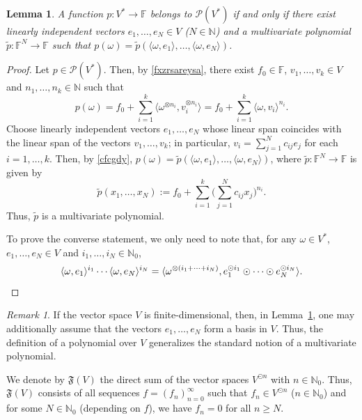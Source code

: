 \documentclass[12pt]{article}
\newtheorem{lemma}[theorem]{Lemma}
\theoremstyle{remark}
\theoremstyle{remark}
\theoremstyle{remark}
\newtheorem{remark}[theorem]{Remark}
\begin{document}
\begin{lemma}\label{cgtxststs5u}
A function $p:V^*\to\mathbb F$ belongs to $\mathcal P(V^*)$ if and only if there exist linearly independent vectors $e_1,\dots,e_N\in V$  ($N\in\mathbb N$) and a multivariate polynomial $\tilde p:\mathbb F^N\to\mathbb F$ such that $p(\omega)=\tilde p(\langle\omega,e_1\rangle,\dots,\langle\omega,e_N\rangle)$.
\end{lemma}

\begin{proof} Let $p\in\mathcal P(V^*)$. Then, by \eqref{fxzrsareysa}, there exist $f_0\in\mathbb F$, $v_1,\dots,v_k\in V$ and $n_1,\dots,n_k\in\mathbb N$ such that 
\begin{equation}\label{cfcgdy}
p(\omega)=f_0+\sum_{i=1}^k\langle\omega^{\otimes n_i},v_i^{\otimes n_i}\rangle
=f_0+\sum_{i=1}^k\langle \omega,v_i\rangle^{n_i}. \end{equation}
Choose linearly independent vectors $e_1,\dots,e_N$ whose linear span coincides with the linear  span of the vectors $v_1,\dots,v_k$; in particular, $v_i=\sum_{j=1}^N c_{ij}e_j$ for each $i=1,\dots,k$. Then, by \eqref{cfcgdy}, $p(\omega)=\tilde p(\langle\omega,e_1\rangle,\dots,\langle\omega,e_N\rangle)$, where $\tilde p:\mathbb F^N\to\mathbb F$ is given by
$$\tilde p(x_1,\dots,x_N):=f_0+ \sum_{i=1}^k\bigg(\sum_{j=1}^N c_{ij}x_j\bigg)^{n_i}.$$
Thus, $\tilde p$ is a multivariate polynomial. 

To prove the converse statement, we only need to note that, for any $\omega\in V^*$, $e_1,\dots,e_N\in V$ and $i_1,\dots,i_N\in\mathbb N_0$,
\[\langle\omega,e_1\rangle^{i_1}\dotsm \langle\omega,e_N\rangle^{i_N}=\langle\omega^{\otimes(i_1+\dots+i_N)},e_1^{\odot i_1}\odot\dotsm\odot e_N^{\odot i_N}\rangle. \qedhere\]
\end{proof}

\begin{remark}
If the vector space $V$ is finite-dimensional, then, in Lemma~\ref{cgtxststs5u}, one may additionally assume that the vectors $e_1,\dots,e_N$ form a basis in $V$. Thus, the definition of a polynomial over $V$ generalizes the standard notion of a multivariate polynomial. 
\end{remark}

We denote by $\mathfrak F(V)$ the direct sum of the vector spaces $V^{\odot n}$ with $n\in\mathbb N_0$. Thus, $\mathfrak F(V)$ consists of all sequences $f=(f_n)_{n=0}^\infty$ such that 
$f_n\in V^{\odot n}$ ($n\in\mathbb N_0$) and for some $N\in\mathbb N_0$ (depending on $f$), we have $f_n=0$ for all $n\ge N$. 
\end{document}
